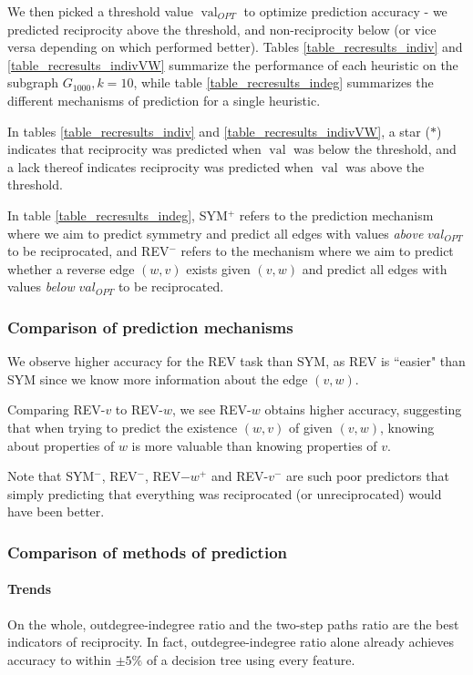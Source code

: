 \documentclass[conference]{IEEEtran}
\begin{document}
We then picked a threshold value $\operatorname{val}_{OPT}$ to optimize prediction accuracy - we predicted reciprocity above the threshold, and non-reciprocity below (or vice versa depending on which performed better). 
Tables \ref{table_recresults_indiv} and \ref{table_recresults_indivVW} summarize the performance of each heuristic on the subgraph $G_{1000}, k=10$, while 
table \ref{table_recresults_indeg} summarizes the different mechanisms of prediction for a single heuristic.

In tables \ref{table_recresults_indiv} and \ref{table_recresults_indivVW}, a star ($*$) indicates that reciprocity was predicted when $\operatorname{val}$ was below the threshold, and a lack thereof indicates reciprocity was predicted when $\operatorname{val}$ was above the threshold.

In table \ref{table_recresults_indeg}, SYM$^+$ refers to the prediction mechanism where we aim to predict symmetry and predict all edges with values \emph{above} $val_{OPT}$ to be reciprocated, and REV$^-$ refers to the mechanism where we aim to predict whether a reverse edge $(w,v)$ exists given $(v,w)$ and predict all edges with values \emph{below} $val_{OPT}$ to be reciprocated. 

\subsubsection{Comparison of prediction mechanisms}
We observe higher accuracy for the REV task than SYM, as REV is ``easier" than SYM 
since we know more information about the edge $(v,w)$.

Comparing REV-$v$ to REV-$w$, we see REV-$w$ obtains higher accuracy, suggesting that when trying to predict the existence $(w,v)$ of given $(v,w)$, knowing about properties of $w$ is more valuable than knowing properties of $v$.

Note that SYM$^-$, REV$^-$, REV$-w^+$ and REV-$v^-$ are such poor predictors that simply predicting that everything was reciprocated (or unreciprocated) would have been better.

\subsubsection{Comparison of methods of prediction}

\paragraph{Trends}
On the whole, outdegree-indegree ratio and the two-step paths ratio are the best indicators of reciprocity. 
In fact, outdegree-indegree ratio alone already achieves accuracy to within $\pm 5\%$ of a decision tree using every feature.
\end{document}
